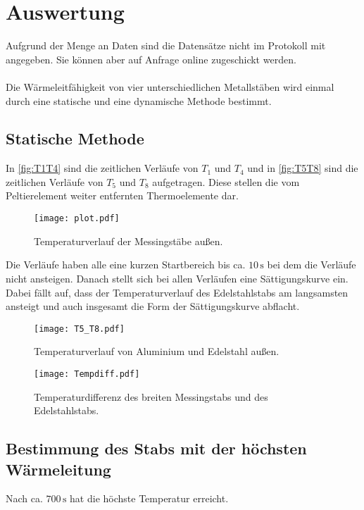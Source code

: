 \section{Auswertung}
\label{sec:Auswertung}
Aufgrund der Menge an Daten sind die Datensätze nicht im Protokoll mit angegeben.
Sie können aber auf Anfrage online zugeschickt werden.\\
\\
Die Wärmeleitfähigkeit von vier unterschiedlichen Metallstäben wird einmal durch eine statische und
eine dynamische Methode bestimmt.

\subsection{Statische Methode}
\label{sec:stat}

In \autoref{fig:T1T4} sind die zeitlichen Verläufe von $T_1$ und $T_4$ und in \autoref{fig:T5T8} sind
die zeitlichen Verläufe von $T_5$ und $T_8$ aufgetragen. Diese stellen die vom Peltierelement weiter
entfernten Thermoelemente dar.

\begin{figure}
  \centering
  \texttt{[image: plot.pdf]}
  \caption{Temperaturverlauf der Messingstäbe außen.}
  \label{fig:T1T4}
\end{figure}
Die Verläufe haben alle eine kurzen Startbereich bis ca. $10 \,\si{\second}$ bei dem die Verläufe nicht
ansteigen. Danach stellt sich bei allen Verläufen eine Sättigungskurve ein.
Dabei fällt auf, dass der Temperaturverlauf des Edelstahlstabs am langsamsten
ansteigt und auch insgesamt die Form der Sättigungskurve abflacht.

\begin{figure}
  \centering
  \texttt{[image: T5\_T8.pdf]}
  \caption{Temperaturverlauf von Aluminium und Edelstahl außen.}
  \label{fig:T5T8}
\end{figure}

\begin{figure}
  \centering
  \texttt{[image: Tempdiff.pdf]}
  \caption{Temperaturdifferenz des breiten Messingstabs und des Edelstahlstabs.}
  \label{fig:Tempdiff}
\end{figure}

\subsection{Bestimmung des Stabs mit der höchsten Wärmeleitung}
\label{hoechste}

Nach ca. $700\,\si{\second}$ hat die höchste Temperatur erreicht.


